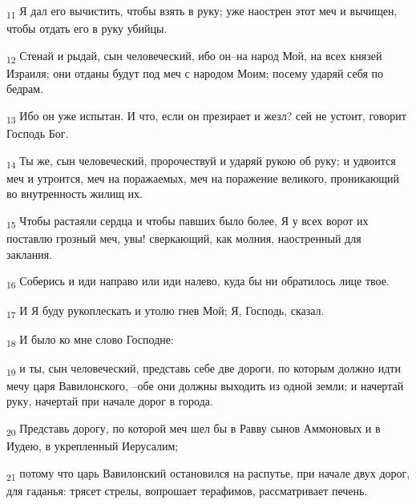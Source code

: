\begin{tcolorbox}
\textsubscript{11} Я дал его вычистить, чтобы взять в руку; уже наострен этот меч и вычищен, чтобы отдать его в руку убийцы.
\end{tcolorbox}
\begin{tcolorbox}
\textsubscript{12} Стенай и рыдай, сын человеческий, ибо он--на народ Мой, на всех князей Израиля; они отданы будут под меч с народом Моим; посему ударяй себя по бедрам.
\end{tcolorbox}
\begin{tcolorbox}
\textsubscript{13} Ибо он уже испытан. И что, если он презирает и жезл? сей не устоит, говорит Господь Бог.
\end{tcolorbox}
\begin{tcolorbox}
\textsubscript{14} Ты же, сын человеческий, пророчествуй и ударяй рукою об руку; и удвоится меч и утроится, меч на поражаемых, меч на поражение великого, проникающий во внутренность жилищ их.
\end{tcolorbox}
\begin{tcolorbox}
\textsubscript{15} Чтобы растаяли сердца и чтобы павших было более, Я у всех ворот их поставлю грозный меч, увы! сверкающий, как молния, наостренный для заклания.
\end{tcolorbox}
\begin{tcolorbox}
\textsubscript{16} Соберись и иди направо или иди налево, куда бы ни обратилось лице твое.
\end{tcolorbox}
\begin{tcolorbox}
\textsubscript{17} И Я буду рукоплескать и утолю гнев Мой; Я, Господь, сказал.
\end{tcolorbox}
\begin{tcolorbox}
\textsubscript{18} И было ко мне слово Господне:
\end{tcolorbox}
\begin{tcolorbox}
\textsubscript{19} и ты, сын человеческий, представь себе две дороги, по которым должно идти мечу царя Вавилонского, --обе они должны выходить из одной земли; и начертай руку, начертай при начале дорог в города.
\end{tcolorbox}
\begin{tcolorbox}
\textsubscript{20} Представь дорогу, по которой меч шел бы в Равву сынов Аммоновых и в Иудею, в укрепленный Иерусалим;
\end{tcolorbox}
\begin{tcolorbox}
\textsubscript{21} потому что царь Вавилонский остановился на распутье, при начале двух дорог, для гаданья: трясет стрелы, вопрошает терафимов, рассматривает печень.
\end{tcolorbox}
